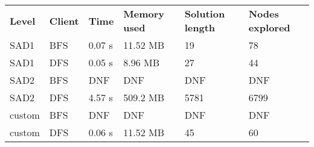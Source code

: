 





\begin{table}[h]
\begin{tabular}{llllll}
\rowcolor[HTML]{EFEFEF} 
\textbf{Level} & \textbf{Client} & \textbf{Time} & \textbf{Memory used} & \textbf{Solution length} & \textbf{Nodes explored} \\
SAD1           & BFS             & 0.07 s        & 11.52 MB             & 19                       & 78                      \\
SAD1           & DFS             & 0.05 s        & 8.96 MB              & 27                       & 44                      \\
SAD2           & BFS             & DNF           & DNF                  & DNF                      & DNF                     \\
SAD2           & DFS             & 4.57 s        & 509.2 MB             & 5781                     & 6799                    \\
custom         & BFS             & DNF           & DNF                  & DNF                      & DNF                     \\
custom         & DFS             & 0.06 s        & 11.52 MB             & 45                       & 60                     
\end{tabular}
\end{table}

